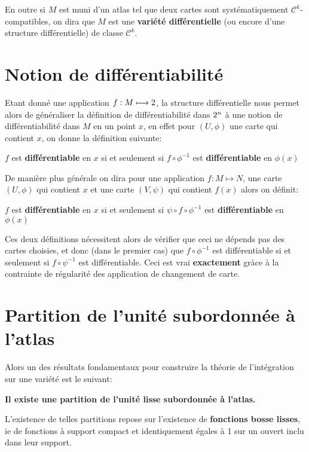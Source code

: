    En outre si \( M \) est muni d'un atlas tel que deux cartes sont systématiquement \( \mathcal{C}^k \)-compatibles, on dira que \( M \) est une \textbf{variété différentielle} (ou encore d'une structure différentielle) de classe \( \mathcal{C}^k \).
   \section{Notion de différentiabilité}
   Etant donné une application \( f : M \longmapsto 2 \), la structure différentielle nous permet alors de généraliser la définition de différentiabilité dans \( 2^n \) à une notion de différentiabilité dans \( M \) en un point \( x \), en effet pour \( (U, \phi) \) une carte qui contient \( x \), on donne la définition suivante:
   \begin{center}
      \( f \) est \textbf{différentiable} en \( x \) si et seulement si \( f \circ \phi^{-1} \) est \textbf{différentiable} en \( \phi(x) \)
   \end{center}
   De manière plus générale on dira pour une application \( f : M \longmapsto N \), une carte \( (U, \phi) \) qui contient \( x \) et une carte \( (V, \psi) \) qui contient \( f(x) \) alors on définit:
   \begin{center}
      \( f \) est \textbf{différentiable} en \( x \) si et seulement si \( \psi \circ f \circ \phi^{-1}\) est \textbf{différentiable} en \( \phi(x) \)
   \end{center}
   Ces deux définitions nécessitent alors de vérifier que ceci ne dépends pas des cartes choisies, et donc (dans le premier cas) que \( f \circ \phi^{-1} \) est différentiable si et seulement si \( f \circ \psi^{-1} \) est différentiable. Ceci est vrai \textbf{exactement} gràce à la contrainte de régularité des application de changement de carte.
   \section{Partition de l'unité subordonnée à l'atlas}
      Alors un des résultats fondamentaux pour construire la théorie de l'intégration sur une variété est le suivant:
      \begin{center}
         \textbf{Il existe une partition de l'unité lisse subordonnée à l'atlas.}
      \end{center}
      L'existence de telles partitions repose sur l'existence de \textbf{fonctions bosse lisses}, ie de fonctions à support compact et identiquement égales à 1 sur un ouvert inclu dans leur support.

